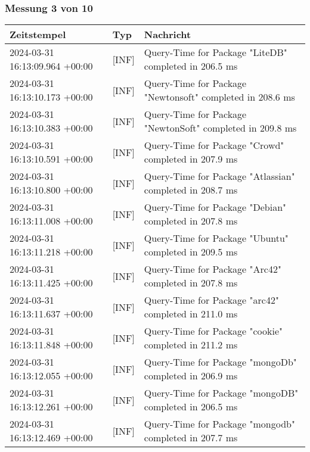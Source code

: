     \subsubsection{Messung 3 von 10} \label{subsubsec:MySQLOhneIndex3von10}
        {
            {\small
                \begin{tabularx}{\textwidth}{|l|l|X|}
                    \hline
                    \textbf{Zeitstempel} & \textbf{Typ} & \textbf{Nachricht} \\
                    \hline
                    \endhead
                    2024-03-31 16:13:09.964 +00:00 & [INF] & Query-Time for Package "LiteDB" completed in 206.5 ms \\
                    2024-03-31 16:13:10.173 +00:00 & [INF] & Query-Time for Package "Newtonsoft" completed in 208.6 ms \\
                    2024-03-31 16:13:10.383 +00:00 & [INF] & Query-Time for Package "NewtonSoft" completed in 209.8 ms \\
                    2024-03-31 16:13:10.591 +00:00 & [INF] & Query-Time for Package "Crowd" completed in 207.9 ms \\
                    2024-03-31 16:13:10.800 +00:00 & [INF] & Query-Time for Package "Atlassian" completed in 208.7 ms \\
                    2024-03-31 16:13:11.008 +00:00 & [INF] & Query-Time for Package "Debian" completed in 207.8 ms \\
                    2024-03-31 16:13:11.218 +00:00 & [INF] & Query-Time for Package "Ubuntu" completed in 209.5 ms \\
                    2024-03-31 16:13:11.425 +00:00 & [INF] & Query-Time for Package "Arc42" completed in 207.8 ms \\
                    2024-03-31 16:13:11.637 +00:00 & [INF] & Query-Time for Package "arc42" completed in 211.0 ms \\
                    2024-03-31 16:13:11.848 +00:00 & [INF] & Query-Time for Package "cookie" completed in 211.2 ms \\
                    2024-03-31 16:13:12.055 +00:00 & [INF] & Query-Time for Package "mongoDb" completed in 206.9 ms \\
                    2024-03-31 16:13:12.261 +00:00 & [INF] & Query-Time for Package "mongoDB" completed in 206.5 ms \\
                    2024-03-31 16:13:12.469 +00:00 & [INF] & Query-Time for Package "mongodb" completed in 207.7 ms \\

\end{tabularx}}}
